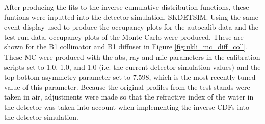 After producing the fits to the inverse cumulative distribution functions, these funtions were inputted into the detector simulation, SKDETSIM. Using the same event display used to produce the occupancy plots for the autocalib data and the test run data, occupancy plots of the Monte Carlo were produced. These are shown for the B1 collimator and B1 diffuser in Figure \ref{fig:ukli_mc_diff_coll}. These MC were produced with the abs, ray and mie parameters in the calibration scripts set to 1.0, 1.0, and 1.0 (i.e. the current detector simulation values) and the top-bottom asymmetry parameter set to 7.598, which is the most recently tuned value of this parameter. Because the original profiles from the test stands were taken in air, adjustments were made so that the refractive index of the water in the detector was taken into account when implementing the inverse CDFs into the detector simulation. 


